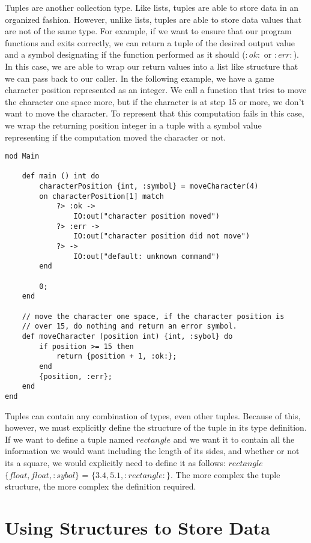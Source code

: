 \documentclass{article}
\begin{document}
Tuples are another collection type. Like lists, tuples are able to store data in an organized fashion. However, unlike lists, tuples are able to store data values that are
not of the same type. For example, if we want to ensure that our program functions and exits correctly, we can return a tuple of the desired output value and a symbol designating
if the function performed as it should ($:ok:$ or $:err:$). In this case, we are able to wrap our return values into a list like structure that we can pass back to our caller. In
the following example, we have a game character position represented as an integer. We call a function that tries to move the character one space more, but if the character is
at step 15 or more, we don't want to move the character. To represent that this computation fails in this case, we wrap the returning position integer in a tuple with a symbol
value representing if the computation moved the character or not.

\begin{lstlisting}
mod Main

	def main () int do
		characterPosition {int, :symbol} = moveCharacter(4)
		on characterPosition[1] match
			?> :ok ->
				IO:out("character position moved")
			?> :err ->
				IO:out("character position did not move")
			?> ->
				IO:out("default: unknown command")
		end

		0;
	end

	// move the character one space, if the character position is
	// over 15, do nothing and return an error symbol.
	def moveCharacter (position int) {int, :sybol} do
		if position >= 15 then
			return {position + 1, :ok:};
		end
		{position, :err};
	end
end
\end{lstlisting}

Tuples can contain any combination of types, even other tuples. Because of this, however, we must explicitly define the structure of the tuple in its type definition. If
we want to define a tuple named $rectangle$ and we want it to contain all the information we would want including the length of its sides, and whether or not its a square,
we would explicitly need to define it as follows: $rectangle$ $\{float, float, :sybol\}$ = $\{3.4, 5.1, :rectangle:\}$. The more complex the tuple structure, the more complex the
definition required.


\section{Using Structures to Store Data}
\end{document}
